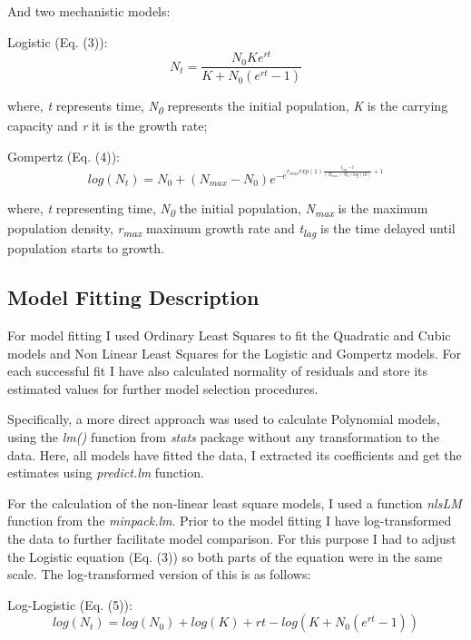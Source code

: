 \documentclass[11]{article}
\begin{document}
And two mechanistic models:

Logistic (Eq. (3)):
\begin{equation}
    N_t = \frac{N_0Ke^{rt}}{K + N_0(e^{rt} - 1)}
\end{equation}

where, \emph{t} represents time, \emph{N\textsubscript{0}} represents the initial population, \emph{K} is the carrying capacity and \emph{r} it is the growth rate;
\newline

Gompertz (Eq. (4)):
\begin{equation}
    log(N_t) = N_0 + (N_{max} - N_0)e^{-e^{r_{max}exp(1)\frac{t_{lag}-t}{(N_{max}-N_0)log(10)}+1}}
\end{equation}

where, \emph{t} representing time, \emph{N\textsubscript{0}} the initial population, \emph{N\textsubscript{max}} is the maximum population density, \emph{r\textsubscript{max}} maximum growth rate and \emph{t\textsubscript{lag}} is the time delayed until population starts to growth.


\subsection{Model Fitting Description}

For model fitting I used Ordinary Least Squares to fit the Quadratic and Cubic models and Non Linear Least Squares for the Logistic and Gompertz models. For each successful fit I have also calculated normality of residuals and store its estimated values for further model selection procedures.

Specifically, a more direct approach was used to calculate Polynomial models, using the \emph{lm()} function from \emph{stats} package without any transformation to the data. Here, all models have fitted the data, I extracted its coefficients and get the estimates using \emph{predict.lm} function.


For the calculation of the non-linear least square models, I used a function \emph{nlsLM} function from the \emph{minpack.lm}. Prior to the model fitting I have log-transformed the data to further facilitate model comparison. For this purpose I had to adjust the Logistic equation (Eq. (3)) so both parts of the equation were in the same scale. The log-transformed version of this is as follows:

Log-Logistic (Eq. (5)):
\begin{equation}
    log(N_t) = log(N_0) + log(K) + rt - log(K + N_0(e^{rt} - 1))
\end{equation}
\end{document}
